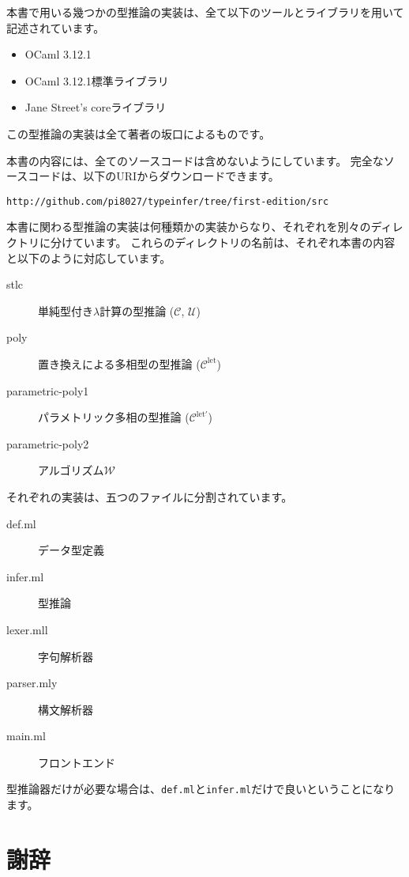 本書で用いる幾つかの型推論の実装は、全て以下のツールとライブラリを用いて記述されています。

\begin{itemize}
 \item OCaml 3.12.1
 \item OCaml 3.12.1標準ライブラリ
 \item Jane Street's coreライブラリ
\end{itemize}

この型推論の実装は全て著者の坂口によるものです。

本書の内容には、全てのソースコードは含めないようにしています。
完全なソースコードは、以下のURIからダウンロードできます。

\texttt{http://github.com/pi8027/typeinfer/tree/first-edition/src}

本書に関わる型推論の実装は何種類かの実装からなり、それぞれを別々のディレクトリに分けています。
これらのディレクトリの名前は、それぞれ本書の内容と以下のように対応しています。

\begin{description}
  \item[stlc] 単純型付き$\lambda$計算の型推論 ($\mathcal C$, $\mathcal U$)
  \item[poly] 置き換えによる多相型の型推論 ($\mathcal C^\mathrm{let}$)
  \item[parametric-poly1] パラメトリック多相の型推論 ($\mathcal C^\mathrm{let'}$)
  \item[parametric-poly2] アルゴリズム$\mathcal W$
\end{description}

それぞれの実装は、五つのファイルに分割されています。

\begin{description}
  \item[def.ml] データ型定義
  \item[infer.ml] 型推論
  \item[lexer.mll] 字句解析器
  \item[parser.mly] 構文解析器
  \item[main.ml] フロントエンド
\end{description}

型推論器だけが必要な場合は、\texttt{def.ml}と\texttt{infer.ml}だけで良いということになります。

\section*{謝辞}



